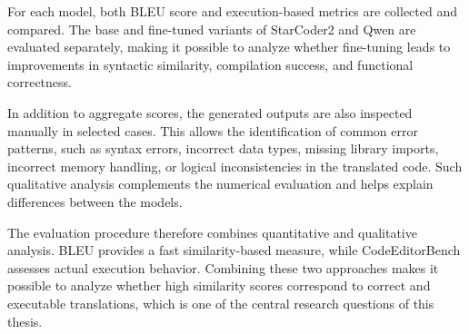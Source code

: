 For each model, both BLEU score and execution-based metrics are collected and
compared. The base and fine-tuned variants of StarCoder2 and Qwen are evaluated
separately, making it possible to analyze whether fine-tuning leads to
improvements in syntactic similarity, compilation success, and functional
correctness.

In addition to aggregate scores, the generated outputs are also inspected
manually in selected cases. This allows the identification of common error
patterns, such as syntax errors, incorrect data types, missing library imports,
incorrect memory handling, or logical inconsistencies in the translated code.
Such qualitative analysis complements the numerical evaluation and helps explain
differences between the models.

The evaluation procedure therefore combines quantitative and qualitative %
analysis. BLEU provides a fast similarity-based measure, while CodeEditorBench
assesses actual execution behavior. Combining these two approaches makes it
possible to analyze whether high similarity scores correspond to correct and
executable translations, which is one of the central research questions of this
thesis.